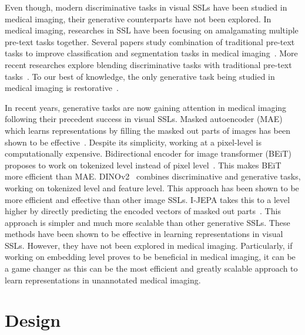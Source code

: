 \documentclass[a4paper,11pt,oneside]{report}
\begin{document}
Even though, modern discriminative tasks in visual SSLs have been studied in medical imaging, their generative counterparts have not been explored. In medical imaging, researches in SSL have been focusing on amalgamating multiple pre-text tasks together. Several papers study combination of traditional pre-text tasks to improve classification and segmentation tasks in medical imaging~\cite{Noroozi2016, Zhuang2019}. More recent researches explore blending discriminative tasks with traditional pre-text tasks~\cite{Zhou2021, Zhang2021, Dufumier2021, Taleb2020, Zhang2021, He2022Intra, Ren2022}. To our best of knowledge, the only generative task being studied in medical imaging is restorative~\cite{Pathak2016,Chen2019,Zhou2021,Tang2022,Haghighi2021,Haghighi2024}.

In recent years, generative tasks are now gaining attention in medical imaging following their precedent success in visual SSLs. Masked autoencoder (MAE) which learns representations by filling the masked out parts of images has been shown to be effective~\cite{He2022}. Despite its simplicity, working at a pixel-level is computationally expensive. Bidirectional encoder for image transformer (BEiT) proposes to work on tokenized level instead of pixel level~\cite{Bao2022beit}. This makes BEiT more efficient than MAE. DINOv2~\cite{Oquab2024dinov} combines discriminative and generative tasks, working on tokenized level and feature level. This approach has been shown to be more efficient and effective than other image SSLs. I-JEPA takes this to a level higher by directly predicting the encoded vectors of masked out parts~\cite{Assran2023}. This approach is simpler and much more scalable than other generative SSLs. These methods have been shown to be effective in learning representations in visual SSLs. However, they have not been explored in medical imaging. Particularly, if working on embedding level proves to be beneficial in medical imaging, it can be a game changer as this can be the most efficient and greatly scalable approach to learn representations in unannotated medical imaging.


\chapter{Design}

\end{document}
